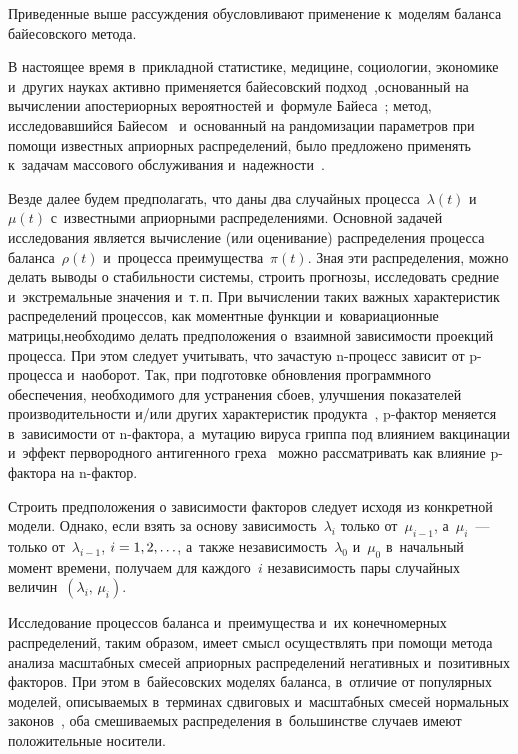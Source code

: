 \begin{multicols}{2}
Приведенные выше рассуждения обусловливают применение к~моделям баланса 
байесовского метода.

В настоящее время в~прикладной статистике, медицине, социологии, экономике 
и~других науках активно применяется байесовский 
подход~\cite{Congdon2006,HWRM2008,CL2008,Albert2009},\linebreak основанный на вычислении 
апостериорных вероятностей и~формуле Байеса~\cite{Laplas1840}; метод, исследовавшийся 
Байесом~\cite{Bayes1763} и~основанный на рандомизации параметров при помощи 
известных \mbox{априорных} распределений, было предложено применять к~задачам 
массового обслуживания и~надежности~\cite{Shorgin05,BKSSh2007,KuSh2015}.

Везде далее будем предполагать, что даны два случайных процесса~$\lambda(t)$ 
и~$\mu(t)$ с~известными априорными распределениями. 
Основной задачей исследования является вычисление (или оценивание) 
распределения процесса баланса~$\rho(t)$ и~процесса\linebreak
 преимущества~$\pi(t)$. 
Зная эти распределения, можно делать выводы о стабильности системы, 
строить прогнозы, исследовать средние и~экстремальные значения и~т.\,п. 
При вычислении таких \mbox{важных} характеристик распределений процессов, 
как моментные функции и~ковариационные матрицы,\linebreak необходимо делать 
предположения о~взаимной зави\-си\-мости проекций процесса. При этом следует учитывать, 
что зачастую \mbox{n-про}\-цесс зависит от \mbox{p-про}\-цес\-са и~наоборот. Так, при подготовке 
об\-нов\-ле\-ния программного обеспечения, необходимого для устранения сбоев, 
улучшения показателей производительности и/или других характеристик 
продукта~\cite{Orlik2005}, p-фак\-тор меняется в~зависимости от n-фак\-то\-ра, 
а~мутацию вируса гриппа под влиянием вакцинации и~эффект первородного
 антигенного греха~\cite{Amantonio,KSCJ,Boni} можно рассматривать 
 как влияние p-фак\-то\-ра на n-фак\-тор.

Строить предположения о зависимости факторов следует исходя из конкретной модели. 
Однако, если взять за основу за\-ви\-си\-мость~$\lambda_i$ только от~$\mu_{i-1}$, 
а~$\mu_i$~--- только от~$\lambda_{i-1}$, $i\hm=1,2,\ldots$, а~так\-же 
не\-за\-ви\-си\-мость~$\lambda_0$ и~$\mu_0$ в~начальный момент времени, 
получаем для каждого~$i$ независимость пары случайных величин~$(\lambda_i,\, \mu_i)$.

Исследование процессов баланса и~преимущества и~их конечномерных распределений,
 таким образом, имеет смысл осуществлять при помощи метода анализа 
 масштабных смесей априорных распределений негативных и~позитивных факторов. 
 При этом в~байесовских моделях баланса, в~отличие от популярных моделей, 
 описываемых в~терминах сдвиговых и~масштабных смесей нормальных 
 законов~\cite{Korolev2011}, оба смешиваемых распределения в~большинстве 
 случаев имеют положительные носители.
 

\end{multicols}
